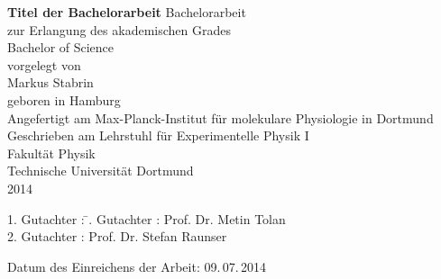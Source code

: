 \documentclass[11pt,a4paper,twoside]{report}
\begin{document}



\newcommand{\thetitle}{Titel der Bachelorarbeit}

\thispagestyle{empty}
\begin{center}
\Huge\textbf{\thetitle}
\vfill
\Large
Bachelorarbeit \\ zur Erlangung des akademischen Grades \\ Bachelor of Science \\
\vspace{20pt}
\normalsize
vorgelegt von \\[5pt]
{\Large Markus Stabrin} \\[5pt]
geboren in Hamburg \\
\vspace{20pt}
Angefertigt am Max-Planck-Institut f\"ur molekulare Physiologie in Dortmund \\ Geschrieben am Lehrstuhl f\"ur Experimentelle Physik I \\ Fakult\"at Physik \\
Technische Universit\"at Dortmund \\ 2014
\end{center}
\newpage


\thispagestyle{empty}
\vspace*{\fill}
\begin{tabbing}
1. Gutachter : \=. Gutachter : \>Prof. Dr. Metin Tolan \\[11pt]
2. Gutachter : \>Prof. Dr. Stefan Raunser \\[11pt]
\end{tabbing}
\vspace{11pt}
Datum des Einreichens der Arbeit: 09.\,07.\,2014
\newpage


\thispagestyle{empty}

\newpage


\tableofcontents\newpage
{}
\listoffigures\newpage
{}
\listoftables\newpage
\end{document}
